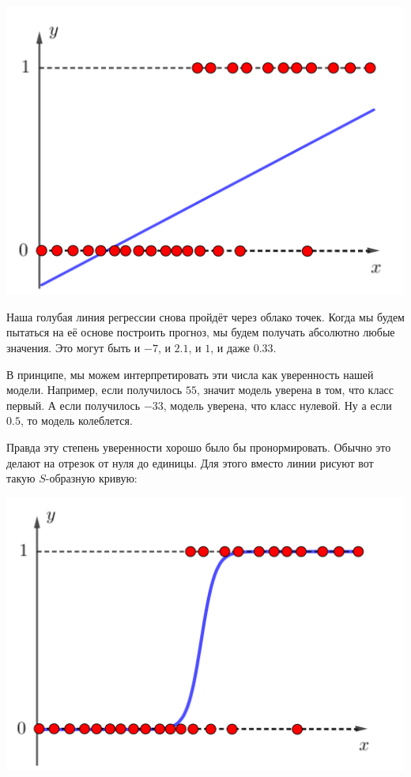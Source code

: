 \documentclass[12pt, a4paper, oneside]{article}
\begin{document}
\begin{center}
	\includegraphics[scale=0.2]{logreg_problem.png}
\end{center}

Наша голубая линия регрессии снова пройдёт через облако точек. Когда мы будем пытаться на её основе построить прогноз, мы будем получать абсолютно любые значения. Это могут быть и $-7$, и $2.1$, и $1$, и даже $0.33$.  

В принципе, мы можем интерпретировать эти числа как уверенность нашей модели. Например, если получилось $55$, значит модель уверена в том, что класс первый. А если получилось $-33$, модель уверена, что класс нулевой. Ну а если $0.5$, то модель колеблется. 

Правда эту степень уверенности хорошо было бы пронормировать. Обычно это делают на отрезок от нуля до единицы. Для этого вместо линии рисуют вот такую $S$-образную  кривую: 

\begin{center}
	\includegraphics[scale=0.2]{logreg_solveprob.png}
\end{center}
\end{document}
